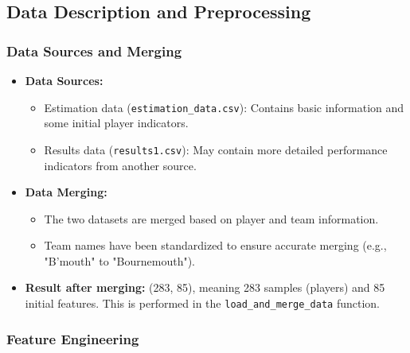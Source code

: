 \documentclass[12pt, a4paper]{report}
\begin{document}
\subsection{Data Description and Preprocessing}
\subsubsection*{Data Sources and Merging}
\begin{itemize}
    \item \textbf{Data Sources:}
    \begin{itemize}
        \item Estimation data (\texttt{estimation\_data.csv}): Contains basic information and some initial player indicators.
        \item Results data (\texttt{results1.csv}): May contain more detailed performance indicators from another source.
    \end{itemize}
    \item \textbf{Data Merging:}
    \begin{itemize}
        \item The two datasets are merged based on player and team information.
        \item Team names have been standardized to ensure accurate merging (e.g., "B'mouth" to "Bournemouth").
    \end{itemize}
    \item \textbf{Result after merging:} (283, 85), meaning 283 samples (players) and 85 initial features. This is performed in the \texttt{load\_and\_merge\_data} function.
\end{itemize}

\subsubsection*{Feature Engineering}
\end{document}
